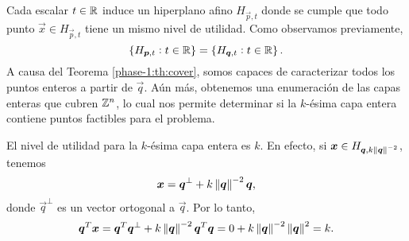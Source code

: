Cada escalar $t \in \mathbb{R}$ induce un hiperplano afino $H_{\vec{p}, t}$ donde se cumple que todo punto
$\vec{x} \in H_{\vec{p}, t}$ tiene un mismo nivel de utilidad. Como observamos previamente,
\begin{equation*}
	\left \lbrace H_{\boldsymbol{p}, t} \vcentcolon t \in \mathbb{R} \right\rbrace
	=
	\left \lbrace H_{\boldsymbol{q}, t} \vcentcolon t \in \mathbb{R} \right\rbrace.
\end{equation*}
A causa del Teorema \ref{phase-1:th:cover}, somos capaces de caracterizar todos los puntos enteros a
partir de $\vec{q}$. Aún más, obtenemos una enumeración de las capas enteras que cubren $\mathbb{Z}^n$, lo
cual nos permite determinar si la $k$-ésima capa entera contiene puntos factibles para el problema.

El nivel de utilidad para la $k$-ésima capa entera es $k$. En efecto, si $\boldsymbol{x} \in H_{\boldsymbol{q},
k\left\lVert \boldsymbol{q} \right\rVert^{-2}}$, tenemos
\begin{equation*}
	\boldsymbol{x} = \boldsymbol{q}^{\perp} + k\left\lVert \boldsymbol{q} \right\rVert^{-2}\boldsymbol{q},
\end{equation*}
donde $\vec{q}^{\perp}$ es un vector ortogonal a $\vec{q}$. Por lo tanto,
\begin{equation*}
	\boldsymbol{q}^T\boldsymbol{x} = \boldsymbol{q}^T\boldsymbol{q}^{\perp} + k\left\lVert \boldsymbol{q} \right\rVert^{-2}\boldsymbol{q}^T\boldsymbol{q}
	= 0 + k \left\lVert \boldsymbol{q} \right\rVert^{-2} \left\lVert \boldsymbol{q} \right\rVert^{2} = k.
\end{equation*}

